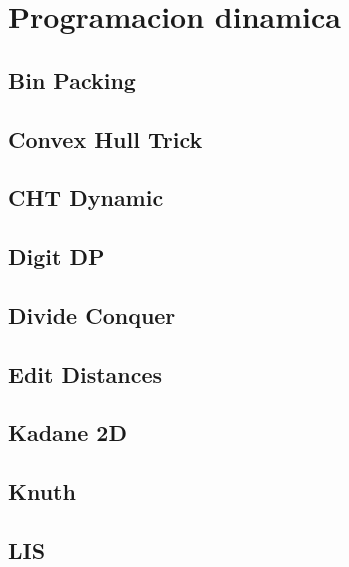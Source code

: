 \section{Programacion dinamica}
\subsection{Bin Packing}
\raggedbottom
\hrulefill
\subsection{Convex Hull Trick}
\raggedbottom
\hrulefill
\subsection{CHT Dynamic}
\raggedbottom
\hrulefill
\subsection{Digit DP}
\raggedbottom
\hrulefill
\subsection{Divide Conquer}
\raggedbottom
\hrulefill
\subsection{Edit Distances}
\raggedbottom
\hrulefill
\subsection{Kadane 2D}
\raggedbottom
\hrulefill
\subsection{Knuth}
\raggedbottom
\hrulefill
\subsection{LIS}
\raggedbottom
\hrulefill
